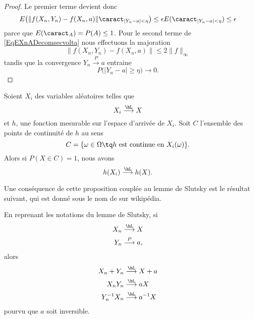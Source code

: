 \begin{proof}
	Le premier terme devient donc
	\begin{equation}
		E\big( \| f(X_n,Y_n)-f(X_n,a) \|\caract_{| Y_n-a |<\eta} \big)\leq \epsilon E(\caract_{| Y_n-a |<\eta})\leq \epsilon
	\end{equation}
	parce que \( E(\caract_A)=P(A)\leq 1\). Pour le second terme de \eqref{EqEXnADecomsecvolta} nous effectuons la majoration
	\begin{equation}
		\| f(X_n,Y_n)-f(X_n,a) \|\leq 2\| f \|_{\infty}
	\end{equation}
	tandis que la convergence \( Y_n\stackrel{P}{\longrightarrow} a\) entraine
	\begin{equation}
		P\big( | Y_n-a |\geq \eta \big)\to 0.
	\end{equation}
\end{proof}

\begin{proposition}     \label{PropcvLsousfonc}
	Soient \( X_i\) des variables aléatoires telles que
	\begin{equation}
		X_i\stackrel{\hL}{\longrightarrow} X
	\end{equation}
	et \( h\), une fonction mesurable sur l'espace d'arrivée de \( X_i\). Soit \( C\) l'ensemble des points de continuité de \( h\) au sens
	\begin{equation}
		C=\{ \omega\in\Omega\tq  h\text{ est continue en } X_i(\omega) \}.
	\end{equation}
	Alors si \( P(X\in C)=1\), nous avons
	\begin{equation}
		h(X_i)\stackrel{\hL}{\longrightarrow}h(X).
	\end{equation}
\end{proposition}

Une conséquence de cette proposition couplée au lemme de Slutsky est le résultat suivant, qui est donné sous le nom de  sur wikipédia.
\begin{corollary}       \label{CorINgTPH}
	En reprenant les notations du lemme de Slutsky, si
	\begin{subequations}
		\begin{align}
			X_n & \stackrel{\hL}{\longrightarrow} X \\
			Y_n & \stackrel{P}{\longrightarrow} a,
		\end{align}
	\end{subequations}
	alors
	\begin{subequations}
		\begin{align}
			X_n+Y_n     & \stackrel{\hL}{\longrightarrow}X+a     \\
			X_nY_n      & \stackrel{\hL}{\longrightarrow}aX      \\
			Y_n^{-1}X_n & \stackrel{\hL}{\longrightarrow}a^{-1}X \\
		\end{align}
	\end{subequations}
	pourvu que \( a\) soit inversible.
\end{corollary}



